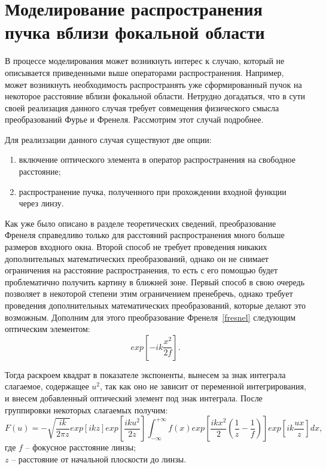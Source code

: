     \newpage
    \section[Моделирование распространения пучка вблизи фокальной области]{\nohyphens{Моделирование распространения пучка вблизи фокальной области}}{
    В процессе моделирования может возникнуть интерес к случаю,
    который не описывается приведенными выше операторами распространения.
    Например, может возникнуть необходимость распространять уже сформированный пучок на некоторое расстояние вблизи фокальной области.
    Нетрудно догадаться, что в сути своей реализация данного случая требует
    совмещения физического смысла преобразований Фурье и Френеля.
    Рассмотрим этот случай подробнее.

    Для реализзации данного случая существуют две опции:
    \begin{enumerate}[\arabic*)]
        \item включение оптического элемента в оператор распространения на свободное расстояние;
        \item распространение пучка, полученного при прохождении входной функции через линзу.
    \end{enumerate}
    \vspace{0.2cm}
    Как уже было описано в разделе теоретических сведений,
    преобразование Френеля справедливо только для расстояний распространения много
    больше размеров входного окна. Второй способ не требует проведения никаких
    дополнительных математических преобразований, однако он не снимает ограничения на расстояние распространения,
    то есть с его помощью будет проблематично получить картину в ближней зоне.
    Первый способ в свою очередь позволяет в некоторой степени этим ограничением пренебречь,
    однако требует проведения дополнительных математических преобразований,
    которые делают это возможным. Дополним для этого преобразование Френеля~\eqref{fresnel} следующим оптическим элементом:
    \begin{equation*}
        exp[-ik \frac{x^2}{2f} ].
    \end{equation*}

    Тогда раскроем квадрат в показателе экспоненты, вынесем за знак интеграла слагаемое, содержащее $u^2$,
    так как оно не зависит от переменной интегрирования,
    и внесем добавленный оптический элемент под знак интеграла.
    После группировки некоторых слагаемых получим:
    \begin{equation*}
        F(u) = - \sqrt{\frac{ik}{2 \pi z}}exp[ikz] exp[{ \frac{iku^2}{2z} }] \int_{-\infty}^{+\infty}f(x) exp[\frac{ikx^2}{2}( \frac{1}{z} - \frac{1}{f})] exp[{ik \frac{ux}{z}}]dx,
    \end{equation*}
    \tab где $f$ -- фокусное расстояние линзы;\\
    \tab \tab \hspace{-0.4cm}$z$ -- расстояние от начальной плоскости до линзы.


}
